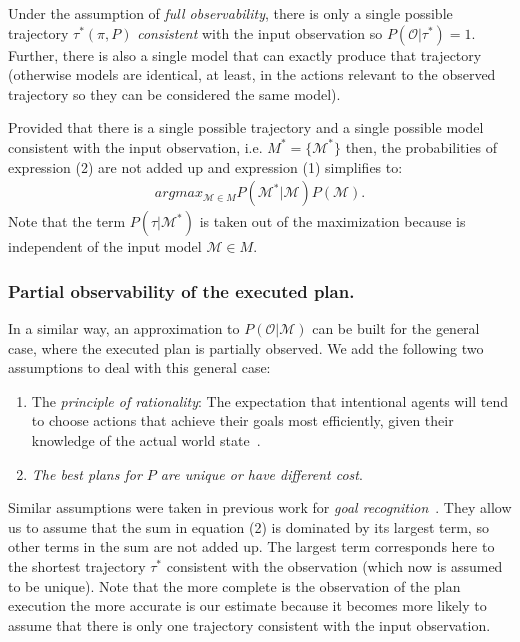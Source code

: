 \documentclass[letterpaper]{article} %
\begin{document}
Under the assumption of {\em full observability}, there is only a single possible trajectory $\tau^*(\pi,P)$ {\em consistent} with the input observation so $P(\mathcal{O}|\tau^*)=1$. Further, there is also a single model that can exactly produce that trajectory (otherwise models are identical, at least, in the actions relevant to the observed trajectory so they can be considered the same model).

Provided that there is a single possible trajectory and a single possible model consistent with the input observation, i.e. $M^*=\{\mathcal{M}^*\}$ then, the probabilities of expression (2) are not added up and expression (1) simplifies to:
\begin{align}
argmax_{\mathcal{M}\in M} P(\mathcal{M^*}|\mathcal{M}) P(\mathcal{M}).
\end{align}
Note that the term $P(\tau|\mathcal{M^*})$ is taken out of the maximization because is independent of the input model $\mathcal{M}\in M$.

\subsubsection{Partial observability of the executed plan.} In a similar way, an approximation to $P(\mathcal{O}|\mathcal{M})$ can be built for the general case, where the executed plan is partially observed. We add the following two assumptions to deal with this general case:

\begin{enumerate}
\item The {\em principle of rationality}: The expectation that intentional agents will tend to choose actions that achieve their goals most efficiently, given their knowledge of the actual world state~\cite{Dennett83}.
\item {\em The best plans for $P$ are unique or have different cost}.
\end{enumerate}

Similar assumptions were taken in previous work for {\em goal recognition}~\cite{ramirez2012plan}. They allow us to assume that the sum in equation (2) is dominated by its largest term, so other terms in the sum are not added up. The largest term corresponds here to the shortest trajectory $\tau^*$ consistent with the observation (which now is assumed to be unique). Note that the more complete is the observation of the plan execution the more accurate is our estimate because it becomes more likely to assume that there is only one trajectory consistent with the input observation.
\end{document}
